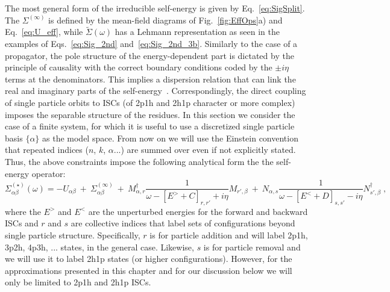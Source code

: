 The most general form of the irreducible self-energy is given by Eq.~\eqref{eq:SigSplit}. The $\Sigma^{(\infty)}$  is defined by the mean-field diagrams of Fig.~\ref{fig:EffOps}a) and Eq.~\eqref{eq:U_eff}, while $\widetilde\Sigma(\omega)$ has a Lehmann representation as seen in the examples of Eqs.~\eqref{eq:Sig_2nd} and~\eqref{eq:Sig_2nd_3b}. Similarly to the case of a propagator, the  pole structure of the energy-dependent part is dictated by the principle of causality with the correct boundary conditions coded by the  $\pm i\eta$ terms at the denominators.  This implies a dispersion relation that  can link the real and imaginary parts of the self-energy~\cite{ch11_MahauxSartor91,ch11_Dickhoff2008}.  Correspondingly, the direct coupling of single particle orbits to  ISCs (of 2p1h and 2h1p character or more complex) imposes  the separable structure of the residues. In this section we consider the case of a  finite system, for which it is useful to use a discretized single particle basis $\{\alpha\}$ as the model space. 
%
From now on we will use the Einstein convention that repeated indices ($n$, $k$, $\alpha$...) are summed over even if not explicitly stated.
%
Thus, the above constraints impose the following  analytical form the the self-energy operator:
\begin{equation}
\Sigma^{(\star)}_{\alpha\beta}(\omega) =  - U_{\alpha \beta}  ~+~ \Sigma^{(\infty)}_{\alpha\beta} ~+~ M^\dagger_{\alpha, r}\frac1{\omega - [E^> +C]_{r,r'} + i \eta}M_{r', \beta} 
       ~+~ N_{\alpha, s}\frac1{\omega - [E^< +D]_{s,s'} - i \eta}N^\dagger_{s', \beta}  \; ,
\label{eq:ADC_SE_form}
\end{equation}
where the $E^>$ and $E^<$ are the unperturbed energies for the forward and backward ISCs and $r$ and $s$ are collective indices that label sets of configurations beyond single particle structure. Specifically, $r$ is for particle addition and will label 2p1h, 3p2h, 4p3h, ... states, in the general case. Likewise, $s$ is for particle removal and we will use it to label 2h1p states (or higher configurations). However, for the approximations presented in this chapter and for our discussion below we will only be limited to 2p1h and 2h1p ISCs.

